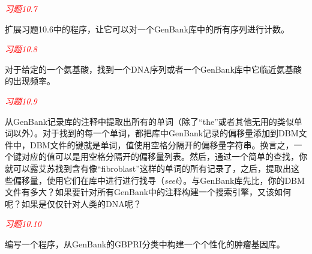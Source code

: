 \textcolor{red}{\textit{习题10.7}}
\begin{adjustwidth}{4em}{}
扩展习题10.6中的程序，让它可以对一个GenBank库中的所有序列进行计数。
\end{adjustwidth}

\textcolor{red}{\textit{习题10.8}}
\begin{adjustwidth}{4em}{}
对于给定的一个氨基酸，找到一个DNA序列或者一个GenBank库中它临近氨基酸的出现频率。
\end{adjustwidth}

\textcolor{red}{\textit{习题10.9}}
\begin{adjustwidth}{4em}{}
  从GenBank记录库的注释中提取出所有的单词（除了“the”或者其他无用的类似单词以外）。对于找到的每一个单词，都把库中GenBank记录的偏移量添加到DBM文件中，DBM文件的键就是单词，值使用空格分隔开的偏移量字符串。换言之，一个键对应的值可以是用空格分隔开的偏移量列表。然后，通过一个简单的查找，你就可以露艾苏找到含有像“fibroblast”这样的单词的所有记录了，之后，提取出这些偏移量，使用它们在库中进行进行找寻（\textit{seek}）。与GenBank库先比，你的DBM文件有多大？如果要针对所有GenBank中的注释构建一个搜索引擎，又该如何呢？如果是仅仅针对人类的DNA呢？
\end{adjustwidth}

\textcolor{red}{\textit{习题10.10}}
\begin{adjustwidth}{4em}{}
编写一个程序，从GenBank的GBPRI分类中构建一个个性化的肿瘤基因库。
\end{adjustwidth}

